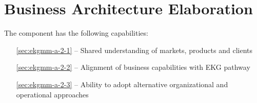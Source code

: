 \chapter{Business Architecture Elaboration}\label{ch:ekgmm-a-2} %

The  component has the following capabilities:

\begin{itemize}[leftmargin=.5in]
  \item [\ref{sec:ekgmm-a-2-1}]  -- Shared understanding of markets, products and clients
  \item [\ref{sec:ekgmm-a-2-2}]  -- Alignment of business capabilities with EKG pathway
  \item [\ref{sec:ekgmm-a-2-3}]  -- Ability to adopt alternative organizational and operational approaches
\end{itemize}






